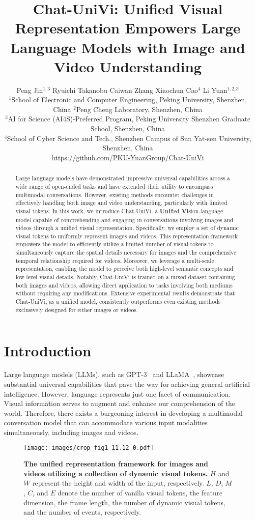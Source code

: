 \documentclass[10pt,twocolumn,letterpaper]{article}
\title{Chat-UniVi: Unified Visual Representation Empowers Large Language Models with Image and Video Understanding}
\author{Peng Jin$^{1,3}$ \quad
    Ryuichi Takanobu \quad
    Caiwan Zhang \quad
    Xiaochun Cao$^{4}$ \quad
    Li Yuan$^{1,2,3}$\\[5pt]
    \small{$^1$School of Electronic and Computer Engineering, Peking University, Shenzhen, China} \quad \small{$^2$Peng Cheng Laboratory, Shenzhen, China} \\
    \small{$^3$AI for Science (AI4S)-Preferred Program, Peking University Shenzhen Graduate School, Shenzhen, China} \\
    \small{$^4$School of Cyber Science and Tech., Shenzhen Campus of Sun Yat-sen University, Shenzhen, China}\\[5pt]
    \href{https://github.com/PKU-YuanGroup/Chat-UniVi}{https://github.com/PKU-YuanGroup/Chat-UniVi}
    }
\begin{document}
\maketitle

\begin{abstract}
Large language models have demonstrated impressive universal capabilities across a wide range of open-ended tasks and have extended their utility to encompass multimodal conversations. However, existing methods encounter challenges in effectively handling both image and video understanding, particularly with limited visual tokens. In this work, we introduce Chat-UniVi, a \textbf{Uni}fied \textbf{Vi}sion-language model capable of comprehending and engaging in conversations involving images and videos through a unified visual representation. Specifically, we employ a set of dynamic visual tokens to uniformly represent images and videos. This representation framework empowers the model to efficiently utilize a limited number of visual tokens to simultaneously capture the spatial details necessary for images and the comprehensive temporal relationship required for videos. Moreover, we leverage a multi-scale representation, enabling the model to perceive both high-level semantic concepts and low-level visual details. Notably, Chat-UniVi is trained on a mixed dataset containing both images and videos, allowing direct application to tasks involving both mediums without requiring any modifications. Extensive experimental results demonstrate that Chat-UniVi, as a unified model, consistently outperforms even existing methods exclusively designed for either images or videos.
\end{abstract}

\section{Introduction}
Large language models (LLMs), such as GPT-3~\cite{brown2020language} and LLaMA~\cite{touvron2023llama,touvron2023llama2}, showcase substantial universal capabilities that pave the way for achieving general artificial intelligence. However, language represents just one facet of communication. Visual information serves to augment and enhance our comprehension of the world. Therefore, there exists a burgeoning interest in developing a multimodal conversation model that can accommodate various input modalities simultaneously, including images and videos. 

\begin{figure}[tbp]
\centering
\texttt{[image: images/crop\_fig1\_11.12\_0.pdf]}
\vspace{-1.6em}
\caption{\textbf{The unified representation framework for images and videos utilizing a collection of dynamic visual tokens.} $H$ and $W$ represent the height and width of the input, respectively. $L$, $D$, $M$, $C$, and $E$ denote the number of vanilla visual tokens, the feature dimension, the frame length, the number of dynamic visual tokens, and the number of events, respectively.}
\vspace{-.8em}
\label{fig1}
\end{figure}
\end{document}
